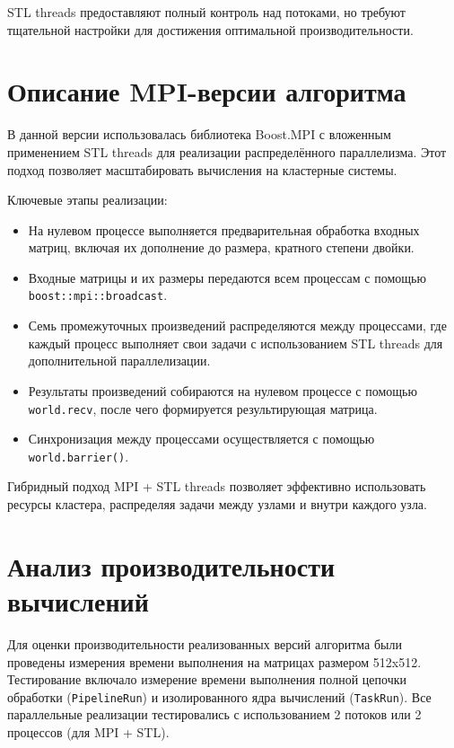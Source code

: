 \documentclass[14pt,a4paper]{extarticle}
\begin{document}
STL threads предоставляют полный контроль над потоками, но требуют тщательной настройки для достижения оптимальной производительности.

\section{Описание MPI-версии алгоритма}

В данной версии использовалась библиотека Boost.MPI с вложенным применением STL threads для реализации распределённого параллелизма. Этот подход позволяет масштабировать вычисления на кластерные системы.

Ключевые этапы реализации:

\begin{itemize}
    \item На нулевом процессе выполняется предварительная обработка входных матриц, включая их дополнение до размера, кратного степени двойки.
    \item Входные матрицы и их размеры передаются всем процессам с помощью \texttt{boost::mpi::broadcast}.
    \item Семь промежуточных произведений распределяются между процессами, где каждый процесс выполняет свои задачи с использованием STL threads для дополнительной параллелизации.
    \item Результаты произведений собираются на нулевом процессе с помощью \texttt{world.recv}, после чего формируется результирующая матрица.
    \item Синхронизация между процессами осуществляется с помощью \texttt{world.barrier()}.
\end{itemize}

Гибридный подход MPI + STL threads позволяет эффективно использовать ресурсы кластера, распределяя задачи между узлами и внутри каждого узла.

\section{Анализ производительности вычислений}

Для оценки производительности реализованных версий алгоритма были проведены измерения времени выполнения на матрицах размером 512x512. Тестирование включало измерение времени выполнения полной цепочки обработки (\texttt{PipelineRun}) и изолированного ядра вычислений (\texttt{TaskRun}). Все параллельные реализации тестировались с использованием 2 потоков или 2 процессов (для MPI + STL).
\end{document}
